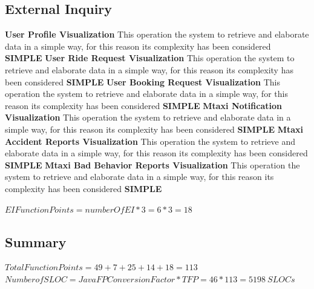 \documentclass[11pt,titlepage]{article} %
\begin{document}
    \subsection{External Inquiry}
       \textbf{User Profile Visualization}\newline
       This operation the system to retrieve and elaborate data in a simple way, for this reason its complexity has been considered \textbf{SIMPLE}\newline\newline
       \textbf{User Ride Request Visualization}\newline
       This operation the system to retrieve and elaborate data in a simple way, for this reason its complexity has been considered \textbf{SIMPLE}\newline\newline
       \textbf{User Booking Request Visualization}\newline
       This operation the system to retrieve and elaborate data in a simple way, for this reason its complexity has been considered \textbf{SIMPLE}\newline\newline
       \textbf{Mtaxi Notification Visualization}\newline
       This operation the system to retrieve and elaborate data in a simple way, for this reason its complexity has been considered \textbf{SIMPLE}\newline\newline
       \textbf{Mtaxi Accident Reports Visualization}\newline
       This operation the system to retrieve and elaborate data in a simple way, for this reason its complexity has been considered \textbf{SIMPLE}\newline\newline
       \newpage
       \textbf{Mtaxi Bad Behavior Reports Visualization}\newline
       This operation the system to retrieve and elaborate data in a simple way, for this reason its complexity has been considered \textbf{SIMPLE}\newline
       \begin{center}
	$ EI Function Points = numberOfEI * 3 = 6 * 3 = 18 $
       \end{center}
     
     \subsection{Summary}
	\begin{center}
	$ Total Function Points = 49 + 7 + 25 + 14 + 18  = 113 $
        $ Number of SLOC = JavaFPConversionFactor * TFP = 46 * 113 = 5198 \: SLOCs $
	\end{center}
\end{document}
